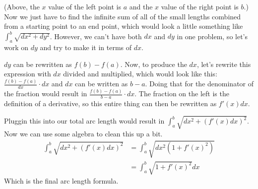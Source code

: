 \documentclass[letterpaper, 12pt]{article}
\begin{document}
\begin{center}
\end{center}
(Above, the $x$ value of the left point is $a$ and the $x$ value of the right point is $b$.)
Now we just have to find the infinite sum of all of the small lengths combined from a starting point to an end point, which would look a little something like $\int_{a}^{b}\sqrt{dx^{2}+dy^{2}}$. However, we can't have both $dx$ and $dy$ in one problem, so let's work on $dy$ and try to make it in terms of $dx$. \par
$dy$ can be rewritten as $f(b)-f(a)$. Now, to produce the $dx$, let's rewrite this expression with $dx$ divided and multiplied, which would look like this: $\frac{f\left(b\right)-f\left(a\right)}{dx}\cdot dx$ and $dx$ can be written as $b-a$. Doing that for the denominator of the fraction would result in $\frac{f\left(b\right)-f\left(a\right)}{b-a}\cdot dx$. The fraction on the left is the definition of a derivative, so this entire thing can then be rewritten as $f'\left(x\right)dx$. \par
Pluggin this into our total arc length would result in $\int_{a}^{b}\sqrt{dx^{2}+\left(f'\left(x\right)dx\right)^{2}}$. Now we can use some algebra to clean this up a bit.
\begin{align}
    \int_{a}^{b}\sqrt{dx^{2}+\left(f'\left(x\right)dx\right)^{2}} & =\int_{a}^{b}\sqrt{dx^{2}\left(1+f'\left(x\right)^{2}\right)} \\
                                                                  & =\boxed{\int_{a}^{b}\sqrt{1+f'\left(x\right)^{2}}dx}
\end{align}
Which is the final arc length formula.
\end{document}
